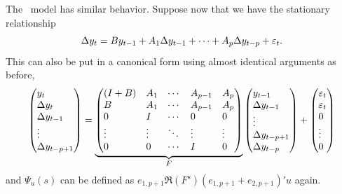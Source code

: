 \documentclass[12pt,fleqn]{article}
\begin{document}
The \VECM\ model has similar behavior. Suppose now that we have the
stationary relationship
\begin{equation*}
  \Delta y_t = B y_{t-1} + A_1 \Delta y_{t-1} + \cdots + A_p \Delta
  y_{t-p} + \varepsilon_t.
\end{equation*}
This can also be put in a canonical form using almost identical
arguments as before,
\begin{equation*}
  \begin{pmatrix*}[l]
    y_t \\ \Delta y_t \\ \Delta y_{t-1} \\ \vdots \\ \Delta y_{t-p+1}
  \end{pmatrix*}
  =
  \underbrace{\begin{pmatrix*}[l]
    (I + B) & A_1    & \cdots & A_{p-1} & A_p    \\
    B       & A_1    & \cdots & A_{p-1} & A_p    \\
    0       & I      & \cdots & 0       & 0      \\
    \vdots  & \vdots & \ddots & \vdots  & \vdots \\
    0       & 0      & \cdots & I       & 0
  \end{pmatrix*}}_F
  \begin{pmatrix*}[l]
    y_{t-1} \\ \Delta y_{t-1} \\ \vdots \\ \Delta y_{t-p+1} \\ \Delta y_{t-p}
  \end{pmatrix*}
  +
  \begin{pmatrix*}[l]
    \vep_t \\ \vep_t \\ 0 \\ \vdots \\ 0
  \end{pmatrix*}
\end{equation*}
and $\Psi_u(s)$ can be defined as
$e_{1,p+1} \Re(F^s) (e_{1,p+1} + e_{2,p+1})' u$ again.
\end{document}
